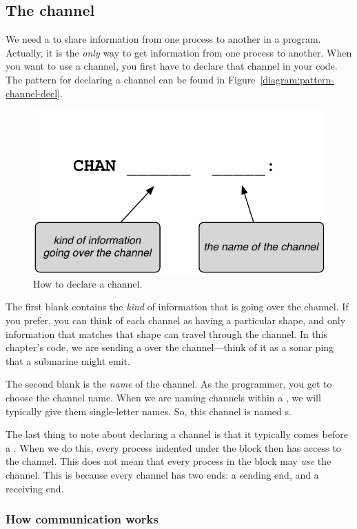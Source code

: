 \subsection{The channel}
We need a \CHANnel to share information from one process to another in a \plumbing program. Actually, it is the {\em only} way to get information from one process to another. When you want to use a channel, you first have to {\strong declare} that channel in your code. The pattern for declaring a channel can be found in Figure~\vref{diagram:pattern-channel-decl}.

\begin{figure}[h]
  \begin{center}
    \includegraphics[width=0.6\linewidth]{images/ch4-pattern-channel-decl}
    \caption{How to declare a channel.}
    \label{diagram:ch4-pattern-channel-decl}
  \end{center}
\end{figure}

The first blank contains the {\em kind} of information that is going over the channel. If you prefer, you can think of each channel as having a particular shape, and only information that matches that shape can travel through the channel. In this chapter's code, we are sending a \SIGNALV over the channel---think of it as a sonar ping that a submarine might emit.

The second blank is the {\em name} of the channel. As the programmer, you get to choose the channel name. When we are naming channels within a \PROC, we will typically give them single-letter names. So, this channel is named {\code s}. 

The last thing to note about declaring a channel is that it typically comes before a \PAR. When we do this, every process indented under the \PARallel block then has access to the channel. This does not mean that every process in the block may {\em use} the channel. This is because every channel has two ends: a sending end, and a receiving end.

\subsubsection{How communication works}

